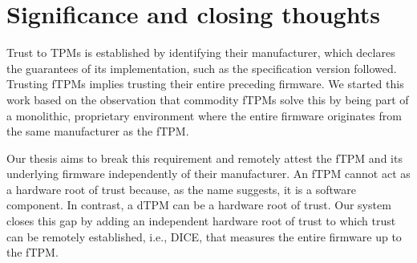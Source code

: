 
\section{Significance and closing thoughts}\label{sec:significance}

Trust to \acp{TPM} is established by identifying their manufacturer, which declares the guarantees of its implementation, such as the specification version followed.
Trusting \acp{fTPM} implies trusting their entire preceding firmware.
We started this work based on the observation that commodity \acp{fTPM} solve this by being part of a monolithic, proprietary environment where the entire firmware originates from the same manufacturer as the \ac{fTPM}.

Our thesis aims to break this requirement and remotely attest the \ac{fTPM} and its underlying firmware independently of their manufacturer.
An \ac{fTPM} cannot act as a hardware root of trust because, as the name suggests, it is a software component.
In contrast, a \ac{dTPM} can be a hardware root of trust.
Our system closes this gap by adding an independent hardware root of trust to which trust can be remotely established, i.e., \ac{DICE}, that measures the entire firmware up to the \ac{fTPM}.



